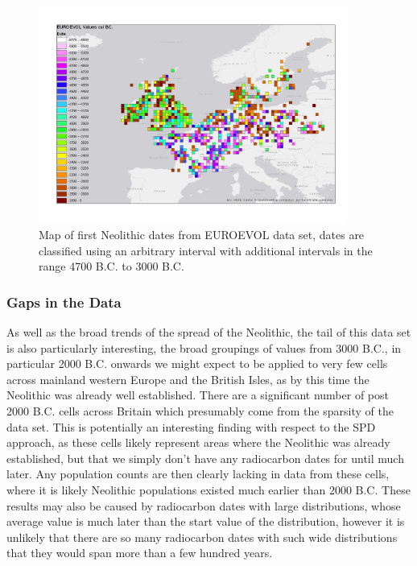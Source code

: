 \begin{figure}
\begin{center}
	\includegraphics[width=0.9\textwidth]{figures/euroevol-detailed2}
\end{center}
  \caption{Map of first Neolithic dates from EUROEVOL data set, dates are classified using an arbitrary interval with additional intervals in the range 4700 B.C. to 3000 B.C. }
  \label{fig:euroevol-detailed2}
\end{figure}

\subsubsection{Gaps in the Data}
As well as the broad trends of the spread of the Neolithic, the tail of this data set is also particularly interesting, the broad groupings of values from 3000 B.C., in particular 2000 B.C. onwards we might expect to be applied to very few cells across mainland western Europe and the British Isles, as by this time the Neolithic was already well established. There are a significant number of post 2000 B.C. cells across Britain which presumably come from the sparsity of the data set. This is potentially an interesting finding with respect to the SPD approach, as these cells likely represent areas where the Neolithic was already established, but that we simply don't have any radiocarbon dates for until much later. Any population counts are then clearly lacking in data from these cells, where it is likely Neolithic populations existed much earlier than 2000 B.C. These results may also be caused by radiocarbon dates with large distributions, whose average value is much later than the start value of the distribution, however it is unlikely that there are so many radiocarbon dates with such wide distributions that they would span more than a few hundred years.

